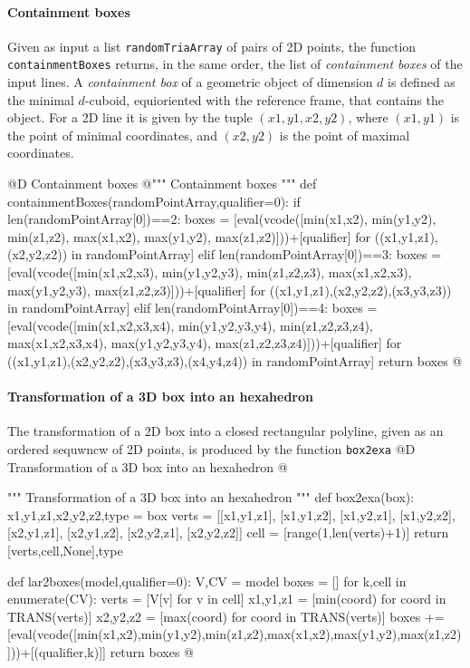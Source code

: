 \documentclass[11pt,oneside]{article}    %
\begin{document}
\paragraph{Containment boxes}

Given as input a list \texttt{randomTriaArray} of pairs of 2D points, the function \texttt{containmentBoxes} returns, in the same order, the list of \emph{containment boxes} of the input lines. A \emph{containment box} of a geometric object of dimension $d$ is defined as the minimal $d$-cuboid, equioriented with the reference frame, that contains the object. For a 2D line it is given by the tuple $(x1,y1,x2,y2)$, where $(x1,y1)$ is the point of minimal coordinates, and $(x2,y2)$ is the point of maximal  coordinates.

@D Containment boxes
@{""" Containment boxes """
def containmentBoxes(randomPointArray,qualifier=0):
    if len(randomPointArray[0])==2:
        boxes = [eval(vcode([min(x1,x2), min(y1,y2), min(z1,z2), 
                             max(x1,x2), max(y1,y2), max(z1,z2)]))+[qualifier]
                for ((x1,y1,z1),(x2,y2,z2)) in randomPointArray]
    elif len(randomPointArray[0])==3:
        boxes = [eval(vcode([min(x1,x2,x3), min(y1,y2,y3), min(z1,z2,z3), 
                             max(x1,x2,x3), max(y1,y2,y3), max(z1,z2,z3)]))+[qualifier]
                for ((x1,y1,z1),(x2,y2,z2),(x3,y3,z3)) in randomPointArray]
    elif len(randomPointArray[0])==4:
        boxes = [eval(vcode([min(x1,x2,x3,x4), min(y1,y2,y3,y4), min(z1,z2,z3,z4), 
                             max(x1,x2,x3,x4), max(y1,y2,y3,y4), max(z1,z2,z3,z4)]))+[qualifier]
                for ((x1,y1,z1),(x2,y2,z2),(x3,y3,z3),(x4,y4,z4)) in randomPointArray]
    return boxes
@}

    
\paragraph{Transformation of a 3D box into an hexahedron}
The transformation of a 2D box into a closed rectangular polyline, given as an ordered sequwncw of 2D points, is produced by the function \texttt{box2exa}
@D Transformation of a 3D box into an hexahedron
@{""" Transformation of a 3D box into an hexahedron """    
def box2exa(box):
    x1,y1,z1,x2,y2,z2,type = box
    verts = [[x1,y1,z1], [x1,y1,z2], [x1,y2,z1], [x1,y2,z2], [x2,y1,z1], [x2,y1,z2], [x2,y2,z1], [x2,y2,z2]]
    cell = [range(1,len(verts)+1)]
    return [verts,cell,None],type

def lar2boxes(model,qualifier=0):
    V,CV = model
    boxes = []
    for k,cell in enumerate(CV):
        verts = [V[v] for v in cell]
        x1,y1,z1 = [min(coord) for coord in TRANS(verts)]
        x2,y2,z2 = [max(coord) for coord in TRANS(verts)]
        boxes += [eval(vcode([min(x1,x2),min(y1,y2),min(z1,z2),max(x1,x2),max(y1,y2),max(z1,z2)]))+[(qualifier,k)]]
    return boxes
@}



\end{document}
